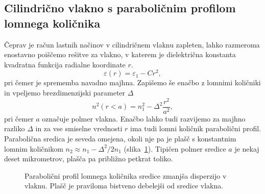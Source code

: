 \subsection*{Cilindrično vlakno s paraboličnim profilom lomnega količnika}
Čeprav je račun lastnih načinov v cilindričnem vlaknu zapleten, lahko 
razmeroma enostavno poiščemo rešitve za vlakno, v katerem je dielektrična 
konstanta kvadratna funkcija radialne koordinate $r$. 
\begin{equation}
\varepsilon (r) = \varepsilon_1 - C r^2,
\end{equation}
pri čemer je sprememba navadno majhna. Zapišemo še enačbo z lomnimi količniki
in vpeljemo brezdimenzijski parameter $\Delta$
\begin{equation}
n^2\left(r<a\right)=n_{1}^{2}- \Delta^2 \frac{r^2}{a^2},
\label{9.15}
\end{equation}
pri čemer $a$ označuje polmer vlakna.
Enačbo lahko tudi razvijemo za majhno razliko $\Delta$ in za vse smiselne vrednosti $r$
ima tudi lomni količnik parabolični profil. Parabolična
sredica je seveda omejena, okoli nje pa je plašč s konstantnim
lomnim količnikom $n_2 \approx n_1-\Delta^2/2n_1$ (slika~\ref{fig:GRIN}). 
Tipičen polmer sredice $a$ je nekaj deset mikrometrov, plašča pa približno petkrat toliko.
\begin{figure}[h]
\centering
\def\svgwidth{90truemm} 
 
\caption{Parabolični profil lomnega količnika sredice zmanjša disperzijo v vlaknu. Plašč
 je praviloma bistveno debelejši od sredice vlakna.}
\label{fig:GRIN}
\end{figure}

